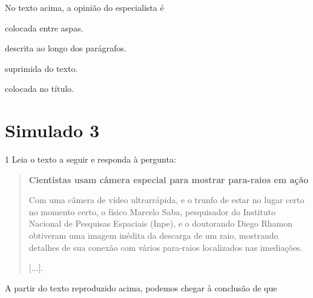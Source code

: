 No texto acima, a opinião do especialista é

\begin{escolha}
\item colocada entre aspas.

\item descrita ao longo dos parágrafos.

\item suprimida do texto.

\item colocada no título.
\end{escolha}


\chapter{Simulado 3}

\num{1} Leia o texto a seguir e responda à pergunta:

\begin{quote}
\textbf{Cientistas usam câmera especial para mostrar para-raios em ação}

Com uma câmera de vídeo ultrarrápida, e o trunfo de estar no lugar
certo no momento certo, o físico Marcelo Saba, pesquisador do Instituto
Nacional de Pesquisas Espaciais (Inpe), e o doutorando Diego Rhamon
obtiveram uma imagem inédita da descarga de um raio, mostrando detalhes
de sua conexão com vários para-raios localizados nas imediações.

{[}...{]}.

\end{quote}

A partir do texto reproduzido acima, podemos chegar à conclusão de que

